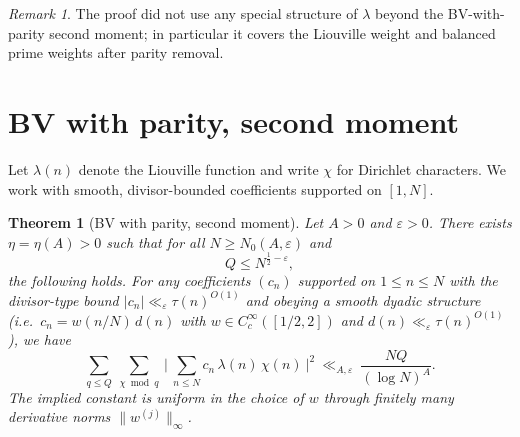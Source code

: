 \documentclass[11pt]{article}
\newtheorem{theorem}[lemma]{Theorem}
\theoremstyle{definition}
\theoremstyle{remark}
\newtheorem{remark}[lemma]{Remark}
\numberwithin{equation}{part}
\begin{document}
\begin{remark}
	The proof did not use any special structure of $\lambda$ beyond the BV-with-parity second moment; in particular it covers the Liouville weight and balanced prime weights after parity removal.
\end{remark}

\section{BV with parity, second moment}\label{sec:bv-parity-2ndmoment}

Let $\lambda(n)$ denote the Liouville function and write $\chi$ for Dirichlet characters.
We work with smooth, divisor-bounded coefficients supported on $[1,N]$.

\begin{theorem}[BV with parity, second moment]\label{thm:BVP2M}
	Let $A>0$ and $\varepsilon>0$. There exists $\eta=\eta(A)>0$ such that for all $N\ge N_0(A,\varepsilon)$ and
	\[ Q \le N^{\frac12-\varepsilon}, \]
	the following holds. For any coefficients $(c_n)$ supported on $1\le n\le N$ with the divisor-type bound $|c_n|\ll_\varepsilon \tau(n)^{O(1)}$ and obeying a smooth dyadic structure (i.e.\ $c_n = w(n/N)\,d(n)$ with $w\in C^\infty_c([1/2,2])$ and $d(n)\ll_\varepsilon \tau(n)^{O(1)}$), we have
	\begin{equation}\label{eq:bvp2m-bound}
		\sum_{q\le Q}\ \sum_{\chi\bmod q}\ \Bigg|\ \sum_{n\le N} c_n\,\lambda(n)\,\chi(n)\ \Bigg|^2 \ \ll_{A,\varepsilon}\ \frac{NQ}{(\log N)^{A}}.
	\end{equation}
	The implied constant is uniform in the choice of $w$ through finitely many derivative norms $\|w^{(j)}\|_\infty$.
\end{theorem}
\end{document}
